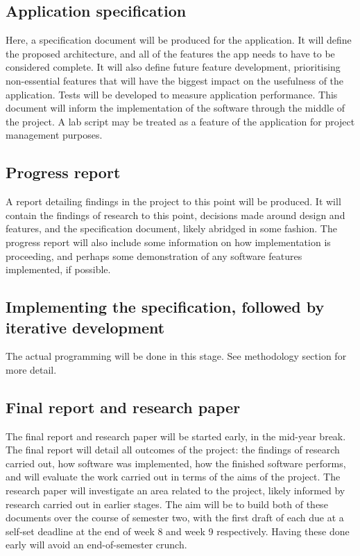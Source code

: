 \documentclass[12pt, a4paper]{amsart}
\begin{document}
\subsection{Application specification}
Here, a specification document will be produced for the application. It will define the proposed architecture, and all of the features the app needs to have to be considered complete. It will also define future feature development, prioritising non-essential features that will have the biggest impact on the usefulness of the application. Tests will be developed to measure application performance. This document will inform the implementation of the software through the middle of the project. A lab script may be treated as a feature of the application for project management purposes. 

\subsection{Progress report}
A report detailing findings in the project to this point will be produced. It will contain the findings of research to this point, decisions made around design and features, and the specification document, likely abridged in some fashion. The progress report will also include some information on how implementation is proceeding, and perhaps some demonstration of any software features implemented, if possible. 

\subsection{Implementing the specification, followed by iterative development}
The actual programming will be done in this stage. See methodology section for more detail.

\subsection{Final report and research paper}
The final report and research paper will be started early, in the mid-year break. The final report will detail all outcomes of the project: the findings of research carried out, how software was implemented, how the finished software performs, and will evaluate the work carried out in terms of the aims of the project. The research paper will investigate an area related to the project, likely informed by research carried out in earlier stages. The aim will be to build both of these documents over the course of semester two, with the first draft of each due at a self-set deadline at the end of week 8 and week 9 respectively. Having these done early will avoid an end-of-semester crunch. 
\end{document}

